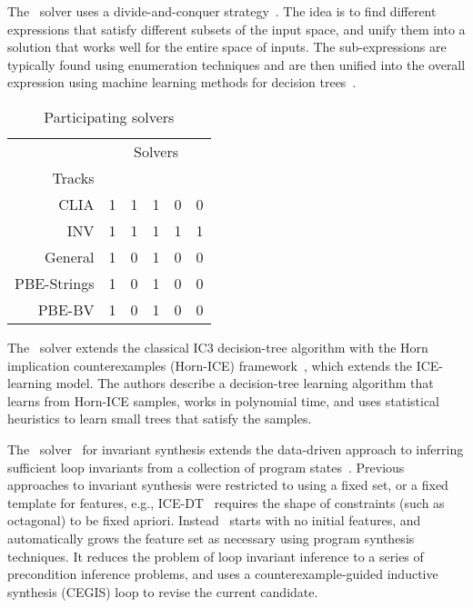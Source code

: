 The \eusolvernew\ solver uses a divide-and-conquer strategy~\cite{AlurCAV15}.
The idea is to find different expressions that satisfy different subsets of the input space,
and unify them into a solution that works well for the entire space of inputs.
The sub-expressions are typically found using enumeration techniques
and are then unified into the overall expression using machine learning methods for decision trees~\cite{AlurRU17}.

\begin{wraptable}{r}{55mm}
	\setlength{\tabcolsep}{5pt}
	\def\arraystretch{1.15}
	\begin{center}
		\begin{tabular}{r||rrrrr}
			& \multicolumn{5}{c}{Solvers} \\[8pt]
			Tracks & \rot{\cvcnew} & \rot{\dryd} & \rot{\eusolvernew} & \rot{\horndini} & \rot{\lig} \\ \hline \hline
			CLIA        & 1 & 1 & 1 & 0 & 0 \\
			INV         & 1 & 1 & 1 & 1 & 1 \\
			General     & 1 & 0 & 1 & 0 & 0 \\ 
			PBE-Strings & 1 & 0 & 1 & 0 & 0 \\ 
			PBE-BV      & 1 & 0 & 1 & 0 & 0 \\
		\end{tabular}
	\end{center}
	\caption{Participating solvers}
	\label{tbl:solvers-in-tracks}
\end{wraptable}

The \horndini\ solver extends the classical IC3 decision-tree algorithm with
the Horn implication counterexamples (Horn-ICE) framework~\cite{EzudheenND0M18},
which extends the ICE-learning model.
The authors describe a decision-tree learning algorithm that learns from Horn-ICE samples,
works in polynomial time, and uses statistical heuristics to learn small trees that satisfy the samples.

The \lig\ solver~\cite{PadhiM17} for invariant synthesis extends the data-driven approach to inferring sufficient loop invariants from a collection of program states~\cite{PadhiSM16}.
Previous approaches to invariant synthesis were restricted to using a fixed set, or a fixed template for features,
e.g., ICE-DT~\cite{ICEDT,GNMR16} requires the shape of constraints (such as octagonal) to be fixed apriori.
Instead \lig\ starts with no initial features, and automatically grows the feature set as necessary using program synthesis techniques.
It reduces the problem of loop invariant inference to a series of precondition inference problems,
and uses a counterexample-guided inductive synthesis (CEGIS) loop to revise the current candidate.